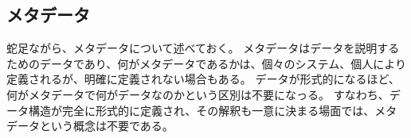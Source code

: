 \subsection{メタデータ}
蛇足ながら、メタデータについて述べておく。
メタデータはデータを説明するためのデータであり、何がメタデータであるかは、個々のシステム、個人により定義されるが、明確に定義されない場合もある。
データが形式的になるほど、何がメタデータで何がデータなのかという区別は不要になっる。
すなわち、データ構造が完全に形式的に定義され、その解釈も一意に決まる場面では、メタデータという概念は不要である。

